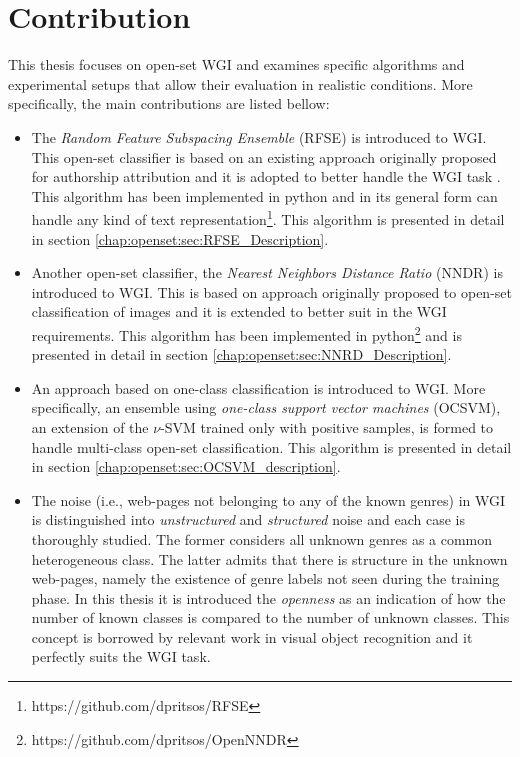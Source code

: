 \section{Contribution} \label{chap:introduction:sec:contribution}

This thesis focuses on open-set WGI and examines specific algorithms and experimental setups that allow their evaluation in realistic conditions. More specifically, the main contributions are listed bellow:

\begin{itemize}
\item The \textit{Random Feature Subspacing Ensemble} (RFSE) is introduced to WGI. This open-set classifier is based on an existing approach originally proposed for authorship attribution and it is adopted to better handle the WGI task \parencite{koppel2011authorship}. This algorithm has been implemented in python and in its general form can handle any kind of text representation\footnote{https://github.com/dpritsos/RFSE}. This algorithm is presented in detail in section \ref{chap:openset:sec:RFSE_Description}.
\item Another open-set classifier, the \textit{Nearest Neighbors Distance Ratio} (NNDR) is introduced to WGI. This is based on approach originally proposed to open-set classification of images \parencite{mendesjunior2016} and it is extended to better suit in the WGI requirements. This algorithm has been implemented in python\footnote{https://github.com/dpritsos/OpenNNDR} and is presented in detail in section \ref{chap:openset:sec:NNRD_Description}.
\item An approach based on one-class classification is introduced to WGI. More specifically, an ensemble using \textit{one-class support vector machines} (OCSVM), an extension of the $\nu$-SVM trained only with positive samples, is formed to handle multi-class open-set classification. This algorithm is presented in detail in section \ref{chap:openset:sec:OCSVM_description}.
\item The noise (i.e., web-pages not belonging to any of the known genres) in WGI is distinguished into \textit{unstructured} and \textit{structured} noise and each case is thoroughly studied. The former considers all unknown genres as a common heterogeneous class. The latter admits that there is structure in the unknown web-pages, namely the existence of genre labels not seen during the training phase. In this thesis it is introduced the \textit{openness} as an indication of how the number of known classes is compared to the number of unknown classes. This concept is borrowed by relevant work in visual object recognition \parencite{scheirer2013toward} and it perfectly suits the WGI task.

\end{itemize}
